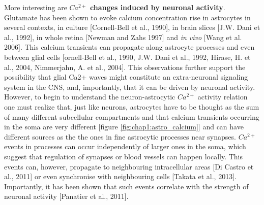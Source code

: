 More interesting are \textbf{$Ca^{2+}$ changes induced by neuronal activity}.
Glutamate has been shown to evoke calcium concentration rise in astrocytes in several contexts, in culture [Cornell-Bell et al., 1990], in brain slices [J.W. Dani et al., 1992], in whole retina [Newman and Zahs 1997] and \textit{in vivo} [Wang et al. 2006].
This calcium transients can propagate along astrocyte processes and even between glial cells [ornell-Bell et al., 1990, J.W. Dani et al., 1992, Hirase, H. et al., 2004, Nimmerjahn, A. et al., 2004].
This observations further support the possibility that glial Ca2+ waves might constitute an extra-neuronal signaling system in the CNS, and, importantly, that it can be driven by neuronal activity. 
However, to begin to understand the neuron-astrocytic $Ca^{2+}$ activity relation one must realize that, just like neurons, astrocytes have to be thought as the sum of many different subcellular compartments and that calcium transients occurring in the soma are very different [figure \ref{fig:chap1:astro_calcium}] and can have different sources as the the ones in fine astrocytic processes near synapses.
$Ca^{2+}$ events in processes can occur independently of larger ones in the soma, which suggest that regulation of synapses or blood vessels can happen locally. 
This events can, however, propagate to neighbouring intracellular areas [Di Castro et al., 2011] or even synchronise with neighbouring cells [Takata et al., 2013].
Importantly, it has been shown that such events correlate with the strength of neuronal activity [Panatier et al., 2011].

